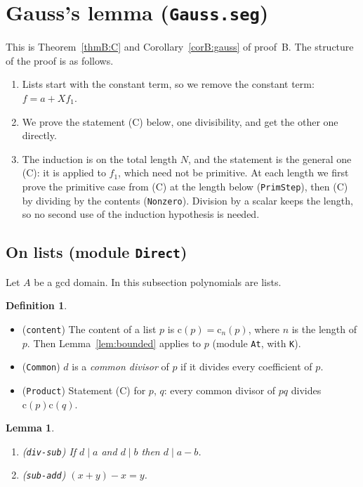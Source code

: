 \documentclass[11pt]{amsart}
\newtheorem{lemma}[theorem]{Lemma}
\theoremstyle{definition}
\newtheorem{definition}[theorem]{Definition}
\theoremstyle{remark}
\newcommand{\nm}[1]{\textup{\texttt{#1}}}
\newcommand{\file}[1]{\textup{\texttt{#1.seg}}}
\newcommand{\cont}{\mathrm{c}}
\begin{document}
\section{Gauss's lemma (\file{Gauss})}\label{sec:gauss}

This is Theorem~\ref{thmB:C} and Corollary~\ref{corB:gauss} of proof~B.
The structure of the proof is as follows.
\begin{enumerate}
\item Lists start with the constant term, so we remove the constant
  term: $f = a + Xf_1$.
\item We prove the statement (C) below, one divisibility, and get the
  other one directly.
\item The induction is on the total length $N$, and the statement is the
  general one (C): it is applied to $f_1$, which need not be primitive.
  At each length we first prove the primitive case from (C) at the length
  below (\nm{PrimStep}), then (C) by dividing by the contents
  (\nm{Nonzero}). Division by a scalar keeps the length, so no second use
  of the induction hypothesis is needed.
\end{enumerate}

\subsection{On lists (module \nm{Direct})}

Let $A$ be a gcd domain. In this subsection polynomials are lists.

\begin{definition}
\begin{itemize}
\item (\nm{content}) The content of a list $p$ is
  $\cont(p) = \cont_{n}(p)$, where $n$ is the length of $p$. Then
  Lemma~\ref{lem:bounded} applies to $p$ (module \nm{At}, with \nm{K}).
\item (\nm{Common}) $d$ is a \emph{common divisor} of $p$ if it divides
  every coefficient of $p$.
\item (\nm{Product}) Statement (C) for $p$, $q$: every common divisor
  of $pq$ divides $\cont(p)\cont(q)$.
\end{itemize}
\end{definition}

\begin{lemma}
\begin{enumerate}
\item (\nm{div-sub}) If $d\mid a$ and $d\mid b$ then $d\mid a-b$.
\item (\nm{sub-add}) $(x+y)-x = y$.
\end{enumerate}
\end{lemma}
\end{document}
